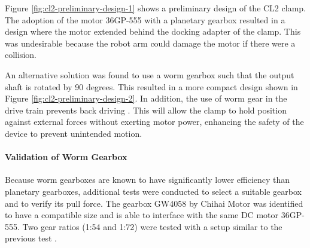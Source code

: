 Figure \ref{fig:cl2-preliminary-design-1} shows a preliminary design of the CL2 clamp. The adoption of the motor 36GP-555 with a planetary gearbox resulted in a design where the motor extended behind the docking adapter of the clamp. This was undesirable because the robot arm could damage the motor if there were a collision. 

An alternative solution was found to use a worm gearbox such that the output shaft is rotated by 90 degrees. This resulted in a more compact design shown in Figure \ref{fig:cl2-preliminary-design-2}. In addition, the use of worm gear in the drive train prevents back driving . This will allow the clamp to hold position against external forces without exerting motor power, enhancing the safety of the device to prevent unintended motion.

\paragraph{Validation of Worm Gearbox}

Because worm gearboxes are known to have significantly lower efficiency than planetary gearboxes, additional tests were conducted to select a suitable gearbox and to verify its pull force. The gearbox GW4058 by Chihai Motor was identified to have a compatible size and is able to interface with the same DC motor 36GP-555. Two gear ratios (1:54 and 1:72) were tested with a setup similar to the previous test .

